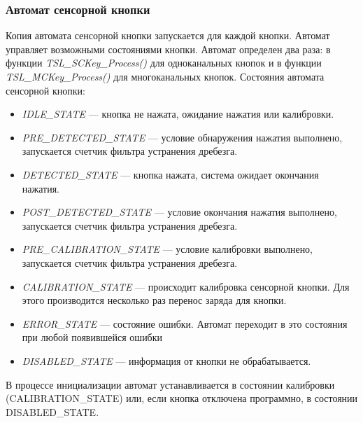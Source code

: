 \subsubsection{Автомат сенсорной кнопки}

Копия автомата сенсорной кнопки запускается для каждой кнопки. Автомат управляет возможными состояниями кнопки. Автомат определен два раза: в функции \textit{TSL\_SCKey\_Process()} для одноканальных кнопок и в функции \textit{ TSL\_MCKey\_Process()} для многоканальных кнопок.
Состояния автомата сенсорной кнопки:
\begin{itemize}
\item \textit{IDLE\_STATE} --- кнопка не нажата, ожидание нажатия или калибровки.

\item \textit{PRE\_DETECTED\_STATE} --- условие обнаружения нажатия выполнено, запускается счетчик фильтра устранения дребезга.

\item \textit{DETECTED\_STATE} --- кнопка нажата, система ожидает окончания нажатия.

\item \textit{POST\_DETECTED\_STATE} --- условие окончания нажатия выполнено, запускается счетчик фильтра устранения дребезга.

\item \textit{PRE\_CALIBRATION\_STATE} --- условие калибровки выполнено, запускается счетчик фильтра устранения дребезга.

\item \textit{CALIBRATION\_STATE} --- происходит калибровка сенсорной кнопки. Для этого производится несколько раз перенос заряда для кнопки.

\item \textit{ERROR\_STATE} --- состояние ошибки. Автомат переходит в это состояния при любой появившейся ошибки

\item \textit{DISABLED\_STATE} --- информация от кнопки не обрабатывается. 
\end{itemize}
В процессе инициализации автомат устанавливается в состоянии калибровки (CALIBRATION\_STATE) или, если кнопка отключена программно, в состоянии DISABLED\_STATE.
